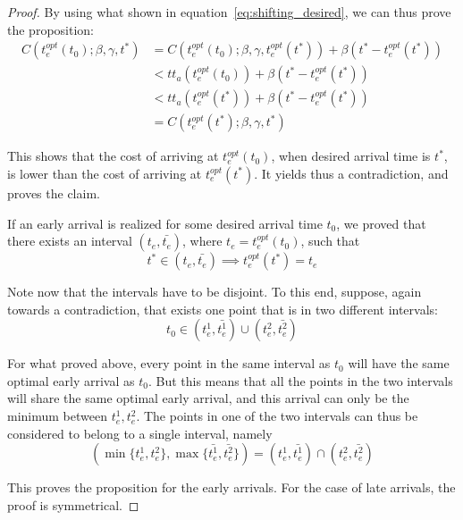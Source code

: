 \begin{proof}
  By using what shown in equation~\eqref{eq:shifting_desired}, we can thus prove the proposition:
  \begin{align*}
    C(t_e^{opt}(t_0); \beta, \gamma, t^*) & = C(t_e^{opt}(t_0); \beta, \gamma, t_e^{opt}(t^*)) + \beta(t^* - t_e^{opt}(t^*)) \\
                                          & < tt_a(t_e^{opt}(t_0)) + \beta(t^* - t_e^{opt}(t^*)) \\
                                          & < tt_a(t_e^{opt}(t^*)) + \beta(t^* - t_e^{opt}(t^*)) \\
                                          & = C(t_e^{opt}(t^*); \beta, \gamma, t^*)
  \end{align*}

  This shows that the cost of arriving at \(t_e^{opt}(t_0)\),
  when desired arrival time is \(t^*\),
  is lower than the cost of arriving at \(t_e^{opt}(t^*)\).
  It yields thus a contradiction,
  and proves the claim.

  If an early arrival is realized for some desired arrival time \(t_0\),
  we proved that there exists an interval \((t_e, \bar{t_e})\),
  where \(t_e = t_e^{opt}(t_0)\),
  such that
  \begin{equation*}
    t^* \in (t_e, \bar{t_e}) \implies t_e^{opt}(t^*) = t_e
  \end{equation*}

  Note now that the intervals have to be disjoint.
  To this end, suppose, again towards a contradiction,
  that exists one point that is in two different intervals:
  \begin{equation*}
    t_0 \in (t_e^1, \bar{t_e^1}) \cup (t_e^2, \bar{t_e^2})
  \end{equation*}

  For what proved above,
  every point in the same interval as \(t_0\) will have the same optimal early arrival as \(t_0\).
  But this means that all the points in the two intervals will share the same optimal early arrival,
  and this arrival can only be the minimum between \(t_e^1, t_e^2\).
  The points in one of the two intervals can thus be considered to belong to a single interval,
  namely
  \begin{equation*}
    (\min\{t_e^1, t_e^2\}, \max\{\bar{t_e^1}, \bar{t_e^2}\}) = (t_e^1, \bar{t_e^1}) \cap (t_e^2, \bar{t_e^2})
  \end{equation*}

  This proves the proposition for the early arrivals.
  For the case of late arrivals,
  the proof is symmetrical.
\end{proof}


